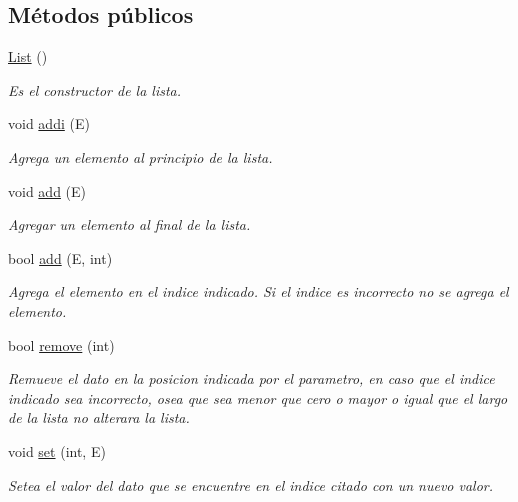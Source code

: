 \subsection*{Métodos públicos}
\begin{DoxyCompactItemize}
\item 
\hypertarget{classList_ae47afd06bd8c39fe7a12d4489998e7c5}{\hyperlink{classList_ae47afd06bd8c39fe7a12d4489998e7c5}{List} ()}\label{classList_ae47afd06bd8c39fe7a12d4489998e7c5}

\begin{DoxyCompactList}\small\item\em Es el constructor de la lista. \end{DoxyCompactList}\item 
void \hyperlink{classList_a4f0fb366c1153a4fd01826e9e6de5afc}{addi} (E)
\begin{DoxyCompactList}\small\item\em Agrega un elemento al principio de la lista. \end{DoxyCompactList}\item 
void \hyperlink{classList_a2a130b7bc38cd968136f1f847e42d0cc}{add} (E)
\begin{DoxyCompactList}\small\item\em Agregar un elemento al final de la lista. \end{DoxyCompactList}\item 
bool \hyperlink{classList_a530267346ebec244900c162de6f467e1}{add} (E, int)
\begin{DoxyCompactList}\small\item\em Agrega el elemento en el indice indicado. Si el indice es incorrecto no se agrega el elemento. \end{DoxyCompactList}\item 
bool \hyperlink{classList_a46cec78299d3e23469276adf46adf9c1}{remove} (int)
\begin{DoxyCompactList}\small\item\em Remueve el dato en la posicion indicada por el parametro, en caso que el indice indicado sea incorrecto, osea que sea menor que cero o mayor o igual que el largo de la lista no alterara la lista. \end{DoxyCompactList}\item 
void \hyperlink{classList_ac8b31be96806bd56f655436629ac2e7a}{set} (int, E)
\begin{DoxyCompactList}\small\item\em Setea el valor del dato que se encuentre en el indice citado con un nuevo valor. \end{DoxyCompactList}\item 

\end{DoxyCompactItemize}

